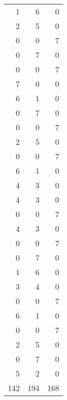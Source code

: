 \begin{tabular}{rrr}
1 & 6 & 0 \\
2 & 5 & 0 \\
0 & 0 & 7 \\
0 & 7 & 0 \\
0 & 0 & 7 \\
7 & 0 & 0 \\
6 & 1 & 0 \\
0 & 7 & 0 \\
0 & 0 & 7 \\
2 & 5 & 0 \\
0 & 0 & 7 \\
6 & 1 & 0 \\
4 & 3 & 0 \\
4 & 3 & 0 \\
0 & 0 & 7 \\
4 & 3 & 0 \\
0 & 0 & 7 \\
0 & 7 & 0 \\
1 & 6 & 0 \\
3 & 4 & 0 \\
0 & 0 & 7 \\
6 & 1 & 0 \\
0 & 0 & 7 \\
2 & 5 & 0 \\
0 & 7 & 0 \\
5 & 2 & 0 \\
142 & 194 & 168 \\
\bottomrule
\end{tabular}
